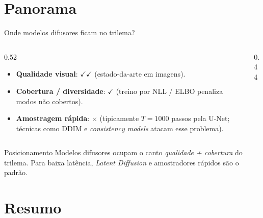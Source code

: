 \documentclass[aspectratio=169,xcolor=dvipsnames]{beamer}
\begin{document}
  \section{Panorama}

  \begin{frame}{Onde modelos difusores ficam no trilema?}
    \begin{columns}[T]
      \begin{column}{0.52\textwidth}
        \begin{itemize}
          \item \textbf{Qualidade visual}: $\checkmark\checkmark$
          (estado-da-arte em imagens).
          \item \textbf{Cobertura / diversidade}: $\checkmark$
          (treino por NLL / ELBO penaliza modos não cobertos).
          \item \textbf{Amostragem rápida}: $\times$ (tipicamente
          $T=1000$ passos pela U-Net; técnicas como DDIM e \emph{consistency
          models} atacam esse problema).
        \end{itemize}
      \end{column}
      \begin{column}{0.44\textwidth}
        \centering
        \resizebox{\linewidth}{!}{\generativetrilemma[diffusion]}
      \end{column}
    \end{columns}
    \vspace{0.3em}
    \begin{block}{Posicionamento}
      Modelos difusores ocupam o canto \emph{qualidade + cobertura}
      do trilema. Para baixa latência, \textit{Latent Diffusion} e
      amostradores rápidos são o padrão.
    \end{block}
  \end{frame}

  \section*{Resumo}
\end{document}
